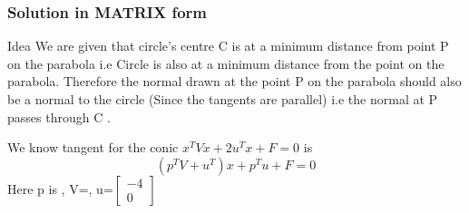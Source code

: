\documentclass{beamer}
\begin{document}

\begin{frame}
\frametitle{Solution in MATRIX form}
\begin{block}{Idea}
We are given that circle's centre C is at a minimum distance from point P on the parabola i.e Circle is also at a minimum distance from the point on the parabola.
\newline
Therefore the normal drawn at the point P on the parabola should also be a normal to the circle (Since the tangents are parallel) i.e the normal at P passes through C .
\end{block}
We know tangent for the conic  $x^TVx+2u^Tx+F=0$ is $$(p^TV+u^T)x+p^Tu+F=0$$
Here p is \left[
  \begin{array}{ c c }
     2t^2\\
     4t
  \end{array} \right],
V=\left[ 
  \begin{array}{ c c }
     0& 0\\
     0 & 1
  \end{array} \right],
  u=$ \left[ 
  \begin{array}{ c  }
     -4\\
     0
  \end{array} \right] $



\end{frame}
\end{document}
